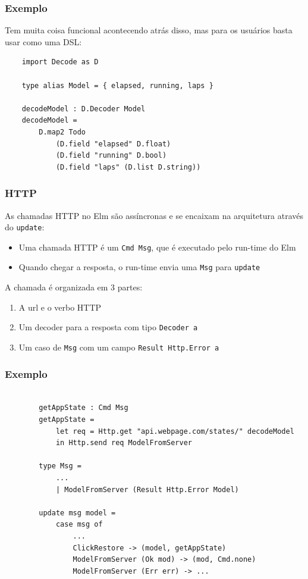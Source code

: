 \documentclass[10pt]{beamer}
\begin{document}
\begin{frame}[fragile]
    \frametitle{Exemplo}
    Tem muita coisa funcional acontecendo atrás disso, mas para os usuários basta usar como uma DSL:
    \begin{verbatim}
    import Decode as D

    type alias Model = { elapsed, running, laps }
    
    decodeModel : D.Decoder Model
    decodeModel =
        D.map2 Todo
            (D.field "elapsed" D.float)
            (D.field "running" D.bool)
            (D.field "laps" (D.list D.string))
    \end{verbatim}
\end{frame}

\begin{frame}[t]
	\frametitle{HTTP}
	\bigskip
	As chamadas HTTP no Elm são assíncronas e se encaixam na arquitetura através do \texttt{update}:
	\bigskip
	\begin{itemize}
		\item Uma chamada HTTP é um \texttt{Cmd Msg}, que é executado pelo run-time do Elm
 		\item Quando chegar a resposta, o run-time envia uma \texttt{Msg} para \texttt{update}
	\end{itemize}
	\bigskip
	A chamada é organizada em 3 partes:
	\bigskip
	\begin{enumerate}
		\item A url e o verbo HTTP
		\item Um decoder para a resposta com tipo \texttt{Decoder a}
		\item Um caso de \texttt{Msg} com um campo \texttt{Result Http.Error a}
	\end{enumerate}
\end{frame}

\begin{frame}[fragile]
	\frametitle{Exemplo}
	\begin{verbatim}
	
		getAppState : Cmd Msg
		getAppState =
			let req = Http.get "api.webpage.com/states/" decodeModel
			in Http.send req ModelFromServer
	
		type Msg = 
			...
			| ModelFromServer (Result Http.Error Model)
				
		update msg model =
			case msg of
				...
				ClickRestore -> (model, getAppState)
				ModelFromServer (Ok mod) -> (mod, Cmd.none)
				ModelFromServer (Err err) -> ...
		
	\end{verbatim}
\end{frame}
\end{document}
